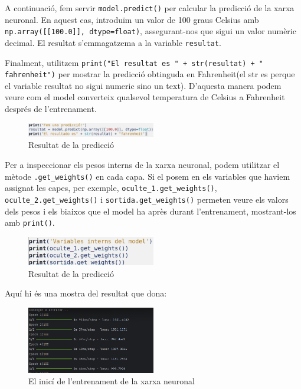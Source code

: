 A continuació, fem servir \texttt{model.predict()} per calcular la predicció de la xarxa neuronal. En aquest cas, introduïm un valor de 100 graus Celsius amb \texttt{np.array([[100.0]], dtype=float)}, assegurant-nos que sigui un valor numèric decimal. El resultat s’emmagatzema a la variable \texttt{resultat}.

Finalment, utilitzem \texttt{print("El resultat es " + str(resultat) + " fahrenheit")} per mostrar la predicció obtinguda en Fahrenheit(el str es perque el variable resultat no sigui numeric sino un text). D’aquesta manera podem veure com el model converteix qualsevol temperatura de Celsius a Fahrenheit després de l’entrenament.


\begin{figure}[H]
    \centering
    \includegraphics[width=0.5\textwidth]{./figures/8.png}
    \caption{Resultat de la predicció}
\end{figure}

Per a inspeccionar els pesos interns de la xarxa neuronal, podem utilitzar el mètode \texttt{.get\_weights()} en cada capa. Si el posem en els variables que haviem assignat les capes, per exemple, \texttt{oculte\_1.get\_weights()}, \texttt{oculte\_2.get\_weights()} i \texttt{sortida.get\_weights()} permeten veure els valors dels pesos i els biaixos que el model ha après durant l’entrenament, mostrant-los amb \texttt{print()}.


\begin{figure}[H]
    \centering
    \includegraphics[width=0.5\textwidth]{./figures/9.png}
    \caption{Resultat de la predicció}
\end{figure}

Aquí hi és una mostra del resultat que dona:

\begin{figure}[H]
    \centering
    \includegraphics[width=0.5\textwidth]{./figures/10.png}
    \caption{El inicí de l'entrenament de la xarxa neuronal}
\end{figure}

